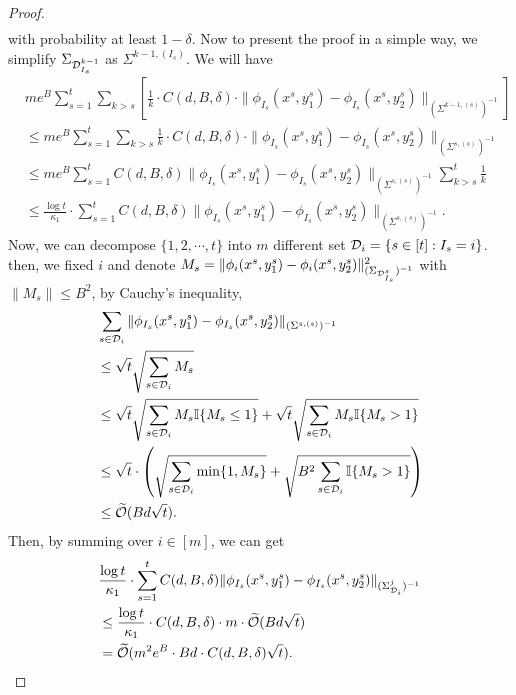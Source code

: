 \begin{proof}
\begin{align}
\end{align}
with probability at least $1-\delta$.
Now to present the proof in a simple way, we simplify $\Sigma_{\mathcal{D}_{I_s}^{k-1}} $ as $\Sigma^{k-1,(I_s)}$.
We will have 
\begin{align}
    & me^B\sum_{s=1}^t \sum_{k>s} \left[\frac{1}{k}\cdot C(d,B,\delta) \cdot \|\phi_{I_s}(x^s,y_1^s)- \phi_{I_s}(x^s, y_2^s)\|_{(\Sigma^{k-1,(s)})^{-1}}\right]\nonumber\\
    &\le  me^B\sum_{s=1}^t \sum_{k>s}\frac{1}{k}\cdot C(d,B,\delta) \cdot \|\phi_{I_s}(x^s,y_1^s)- \phi_{I_s}(x^s, y_2^s)\|_{(\Sigma^{s,(s)})^{-1}}\nonumber\\
    &\le  me^B\sum_{s=1}^t C(d,B,\delta)\|\phi_{I_s}(x^s,y_1^s)- \phi_{I_s}(x^s, y_2^s)\|_{(\Sigma^{s,(s)})^{-1}}\sum_{k>s}^t \frac{1}{k}\nonumber\\
    &\le \frac{\log t}{\kappa_1} \cdot \sum_{s=1}^t C(d,B,\delta)\|\phi_{I_s}(x^s,y_1^s)- \phi_{I_s}(x^s, y_2^s)\|_{(\Sigma^{s,(s)})^{-1}}.\label{eq:alpha3}
    \end{align}
Now, we can decompose $\{1,2,\cdots, t\}$ into $m$ different set $\mathcal{D}_i = \{s \in [t]: I_s = i\}$. then, we fixed $i$ and denote $M_s=\|\phi_i(x^s,y_1^s)-\phi_i(x^s,y_2^s)\|^2_{(\Sigma_{\mathcal{D}_{I_s}^{s}})^{-1}}$ with $\|M_s\| \le B^2$, by Cauchy's inequality,
\begin{align}
    &\sum_{s \in \mathcal{D}_i}\|\phi_{I_s}(x^s,y_1^s)- \phi_{I_s}(x^s, y_2^s)\|_{(\Sigma^{s,(s)})^{-1}}\nonumber\\
    &\le \sqrt{t}\sqrt{\sum_{s \in \mathcal{D}_i}M_s}\nonumber\\
    &\le \sqrt{t}\sqrt{\sum_{s \in \mathcal{D}_i}M_s\mathbb{I}\{M_s\le 1\}} + \sqrt{t}\sqrt{\sum_{s \in \mathcal{D}_i}M_s \mathbb{I}\{M_s > 1\}}\nonumber\\
    &\le \sqrt{t}\cdot \left(\sqrt{\sum_{s \in \mathcal{D}_i}\min\{1,M_s\}} + \sqrt{B^2\sum_{s \in \mathcal{D}_i}\mathbb{I}\{M_s>1\}}\right)\nonumber\\
    &\le \widetilde{\mathcal{O}}(Bd\sqrt{t}).\nonumber
\end{align}
Then, by summing over $i \in [m]$, we can get 
    \begin{align}
    &\frac{\log t}{\kappa_1} \cdot \sum_{s=1}^t C(d,B,\delta)\|\phi_{I_s}(x^s,y_1^s)- \phi_{I_s}(x^s, y_2^s)\|_{(\Sigma_{\cD_i}^{j})^{-1}}\nonumber\\
    &\le \frac{\log t}{\kappa_1} \cdot C(d,B,\delta) \cdot m \cdot \widetilde{\cO}(Bd\sqrt{t})\nonumber\\
    & = \widetilde{\cO}(m^2 e^B\cdot Bd\cdot C(d,B,\delta)\sqrt{t}). \label{ineq: bound(C)}

\end{align}
\end{proof}
